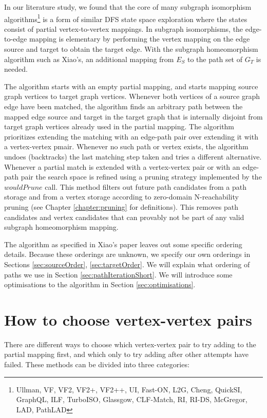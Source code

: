 In our literature study, we found that the core of many subgraph isomorphism algorithms\footnote{Ullman, VF, VF2, VF2+, VF2++, UI, Fast-ON, L2G, Cheng, QuickSI, GraphQL, ILF, TurboISO, Glassgow, CLF-Match, RI, RI-DS, McGregor, LAD, PathLAD} is a form of similar DFS state space exploration where the states consist of partial vertex-to-vertex mappings. In subgraph isomorphisms, the edge-to-edge mapping is elementary by performing the vertex mapping on the edge source and target to obtain the target edge. With the subgraph homeomorphism algorithm such as Xiao's, an additional mapping from $E_S$ to the path set of $G_T$ is needed.

The algorithm starts with an empty partial mapping, and starts mapping source graph vertices to target graph vertices. Whenever both vertices of a source graph edge have been matched, the algorithm finds an arbitrary path between the mapped edge source and target in the target graph that is internally disjoint from target graph vertices already used in the partial mapping. The algorithm prioritizes extending the matching with an edge-path pair over extending it with a vertex-vertex pmair. Whenever no such path or vertex exists, the algorithm undoes (backtracks) the last matching step taken and tries a different alternative. Whenever a partial match is extended with a vertex-vertex pair or with an edge-path pair the search space is refined using a pruning strategy implemented by the $wouldPrune$ call. This method filters out future path candidates from a path storage and from a vertex storage according to zero-domain N-reachability pruning (see Chapter \ref{chapter:pruning} for definitions). This removes path candidates and vertex candidates that can provably not be part of any valid subgraph homeomorphism mapping.

The algorithm as specified in Xiao's paper leaves out some specific ordering details. Because these orderings are unknown, we specify our own orderings in Sections \ref{sec:sourceOrder}, \ref{sec:targetOrder}. We will explain what ordering of paths we use in Section \ref{sec:pathIterationShort}. We will introduce some optimisations to the algorithm in Section \ref{sec:optimisations}.

\section{How to choose vertex-vertex pairs}
There are different ways to choose which vertex-vertex pair to try adding to the partial mapping first, and which only to try adding after other attempts have failed. These methods can be divided into three categories:

